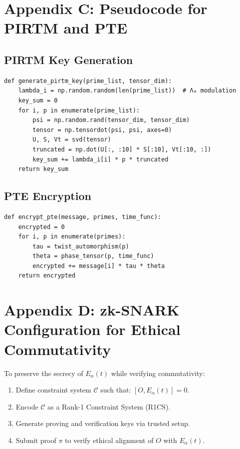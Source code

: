 \documentclass{article}
\theoremstyle{plain}
\begin{document}
\section{Appendix C: Pseudocode for PIRTM and PTE}

\subsection{PIRTM Key Generation}
\begin{verbatim}
def generate_pirtm_key(prime_list, tensor_dim):
    lambda_i = np.random.random(len(prime_list))  # Λₘ modulation
    key_sum = 0
    for i, p in enumerate(prime_list):
        psi = np.random.rand(tensor_dim, tensor_dim)
        tensor = np.tensordot(psi, psi, axes=0)
        U, S, Vt = svd(tensor)
        truncated = np.dot(U[:, :10] * S[:10], Vt[:10, :])
        key_sum += lambda_i[i] * p * truncated
    return key_sum
\end{verbatim}

\subsection{PTE Encryption}
\begin{verbatim}
def encrypt_pte(message, primes, time_func):
    encrypted = 0
    for i, p in enumerate(primes):
        tau = twist_automorphism(p)
        theta = phase_tensor(p, time_func)
        encrypted += message[i] * tau * theta
    return encrypted
\end{verbatim}

\section{Appendix D: zk-SNARK Configuration for Ethical Commutativity}

To preserve the secrecy of $E_\alpha(t)$ while verifying commutativity:

\begin{enumerate}
  \item Define constraint system $\mathcal{C}$ such that: $[O, E_\alpha(t)] = 0$.
  \item Encode $\mathcal{C}$ as a Rank-1 Constraint System (R1CS).
  \item Generate proving and verification keys via trusted setup.
  \item Submit proof $\pi$ to verify ethical alignment of $O$ with $E_\alpha(t)$.
\end{enumerate}
\end{document}
